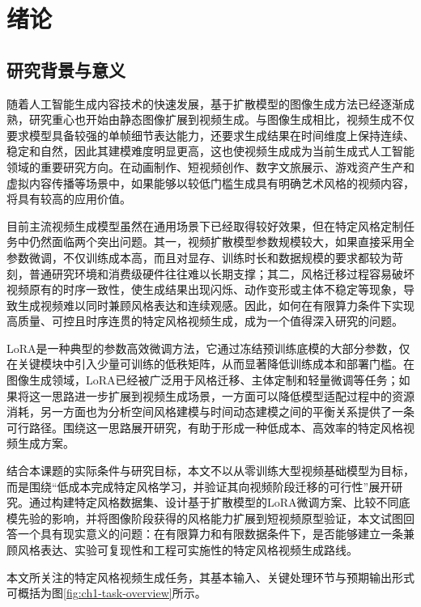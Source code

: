
\chapter{绪论}

\section{研究背景与意义}

随着人工智能生成内容技术的快速发展，基于扩散模型\cite{ref1}的图像生成方法已经逐渐成熟，研究重心也开始由静态图像扩展到视频生成。与图像生成相比，视频生成不仅要求模型具备较强的单帧细节表达能力，还要求生成结果在时间维度上保持连续、稳定和自然，因此其建模难度明显更高，这也使视频生成成为当前生成式人工智能领域的重要研究方向\cite{ref2}。在动画制作、短视频创作、数字文旅展示、游戏资产生产和虚拟内容传播等场景中，如果能够以较低门槛生成具有明确艺术风格的视频内容，将具有较高的应用价值。

目前主流视频生成模型虽然在通用场景下已经取得较好效果，但在特定风格定制任务中仍然面临两个突出问题。其一，视频扩散模型参数规模较大，如果直接采用全参数微调，不仅训练成本高，而且对显存、训练时长和数据规模的要求都较为苛刻，普通研究环境和消费级硬件往往难以长期支撑；其二，风格迁移过程容易破坏视频原有的时序一致性，使生成结果出现闪烁、动作变形或主体不稳定等现象，导致生成视频难以同时兼顾风格表达和连续观感。因此，如何在有限算力条件下实现高质量、可控且时序连贯的特定风格视频生成，成为一个值得深入研究的问题。

LoRA\cite{ref3}是一种典型的参数高效微调方法，它通过冻结预训练底模的大部分参数，仅在关键模块中引入少量可训练的低秩矩阵，从而显著降低训练成本和部署门槛。在图像生成领域，LoRA已经被广泛用于风格迁移、主体定制和轻量微调等任务\cite{ref4}；如果将这一思路进一步扩展到视频生成场景，一方面可以降低模型适配过程中的资源消耗，另一方面也为分析空间风格建模与时间动态建模之间的平衡关系提供了一条可行路径。围绕这一思路展开研究，有助于形成一种低成本、高效率的特定风格视频生成方案。

结合本课题的实际条件与研究目标，本文不以从零训练大型视频基础模型为目标，而是围绕“低成本完成特定风格学习，并验证其向视频阶段迁移的可行性”展开研究。通过构建特定风格数据集、设计基于扩散模型的LoRA微调方案、比较不同底模先验的影响，并将图像阶段获得的风格能力扩展到短视频原型验证，本文试图回答一个具有现实意义的问题：在有限算力和有限数据条件下，是否能够建立一条兼顾风格表达、实验可复现性和工程可实施性的特定风格视频生成路线。

本文所关注的特定风格视频生成任务，其基本输入、关键处理环节与预期输出形式可概括为图\ref{fig:ch1-task-overview}所示。

